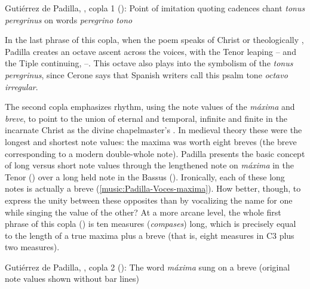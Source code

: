 \begin{musicexample}
    \caption{Gutiérrez de Padilla, , copla 1
    (): Point of imitation quoting cadences chant \emph{tonus
    peregrinus} on words \emph{peregrino tono}}

    \label{music:Padilla-Voces-peregrino_tono}

\end{musicexample}

In the last phrase of this copla, when the poem speaks of Christ  or theologically , Padilla
creates an octave ascent across the voices, with the Tenor leaping
-- and the Tiple continuing, --.
This octave also plays into the symbolism of the \emph{tonus peregrinus}, since
Cerone says that Spanish writers call this  psalm tone
\emph{octavo irregular}.%
    \Autocite[354]{Cerone:Melopeo}

The second copla emphasizes rhythm, using the note values of the \emph{máxima}
and \emph{breve}, to point to the union of eternal and temporal, infinite and
finite in the incarnate Christ as the divine chapelmaster's
.
In medieval theory these were the longest and shortest note values: the maxima
was worth eight breves (the breve corresponding to a modern double-whole note).
Padilla presents the basic concept of long versus short note values through the
lengthened note on \emph{máxima} in the Tenor () over a long
held note in the Bassus ().
Ironically, each of these long notes is actually a breve
(\cref{music:Padilla-Voces-maxima}).
How better, though, to express the unity between these opposites than by
vocalizing the name for one while singing the value of the other?
At a more arcane level, the whole first phrase of this copla
() is ten measures (\emph{compases}) long, which is precisely
equal to the length of a true maxima plus a breve (that is, eight measures in C3
plus two measures).

\begin{musicexample}
    \caption{Gutiérrez de Padilla, , copla 2
    (): The word \emph{máxima} sung on a breve (original note
    values shown without bar lines)}
  
    \label{music:Padilla-Voces-maxima}

\end{musicexample}


